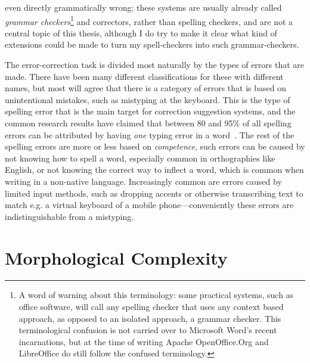\documentclass[officiallayout]{unihelcompling}
\begin{document}
even directly grammatically wrong; these systems are usually already called
\emph{grammar checkers}\footnote{A word of warning about this terminology:
    some practical systems, such as office software, will call any spelling
    checker that uses any context based approach, as opposed to an isolated
    approach, a grammar checker. This terminological confusion is not carried
over to Microsoft Word's recent incarnations, but at the time of writing Apache
OpenOffice.Org and LibreOffice do still follow the confused terminology.} and
correctors, rather than spelling checkers, and are not a central topic of this
thesis, although I do try to make it clear what kind of extensions could be
made to turn my spell-checkers into such grammar-checkers.

The error-correction task is divided most naturally by the types of errors that
are made. There have been many different classifications for these with
different names, but most will agree that there is a
category of errors that is based on unintentional mistakes, such as
mistyping at the keyboard. This is the type of spelling error that is the
main target for correction suggestion systems, and the common
research results have claimed that between 80 and 95\% of all spelling
errors can be attributed by having \emph{one} typing error in a 
word~\citep{kukich1992techniques}. The rest of the spelling errors are more
or less based on \emph{competence}, such errors can be caused by not knowing
how to spell a word, especially common in orthographies like English, or not
knowing the correct way to inflect a word, which is common when writing in a
non-native language. Increasingly common are errors caused by limited input
methods, such as dropping accents or otherwise transcribing text to match e.g.
a virtual keyboard of a mobile phone---conveniently these errors are 
indistinguishable from a mistyping.



\section{Morphological Complexity}
\label{sec:morphological-complexity}
\end{document}
